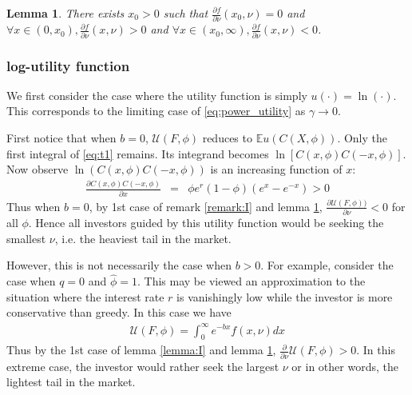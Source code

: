 \documentclass{article}
\newcommand{\pd}[2]{
  \frac{\partial #1}{\partial #2}
}
\newcommand{\opd}[1]{
  \frac{\partial}{\partial #1}
}
\newcommand{\E}{
  \mathbb{E}
}
\newcommand{\1}[1]{
  \mathbf{1}_{\{#1\}}
}
\newtheorem{lemma}{Lemma}
\begin{document}
\begin{lemma}
  \label{lemma:II}
  There exists $x_0 > 0$ such that $\pd{f}{\nu}(x_0, \nu) = 0$ and
  $\forall x \in (0, x_0), \pd{f}{\nu}(x, \nu) > 0$ and
  $\forall x \in (x_0, \infty), \pd{f}{\nu}(x, \nu) < 0$.
\end{lemma}

\subsubsection{log-utility function}
We first consider the case where the utility function is simply
$u(\cdot) = \ln(\cdot)$. This corresponds to the limiting case of
\eqref{eq:power_utility} as $\gamma \to 0$.

First notice that when $b = 0$, $\mathcal U(F, \phi)$ reduces to
$\E u(C(X, \phi))$. Only the first integral of \eqref{eq:t1} remains.
Its integrand becomes $\ln[C(x, \phi) C(-x, \phi)]$.
Now observe $\ln(C(x, \phi)C(-x, \phi))$ is an increasing function of
$x$:
\begin{eqnarray*}
  \pd{C(x, \phi) C(-x, \phi)}{x}
  &=&
  \phi e^r (1 - \phi) (e^x - e^{-x}) > 0
\end{eqnarray*}
Thus when $b = 0$, by 1st case of remark \ref{remark:I} and lemma
\ref{lemma:II},
$\pd{\mathcal U(F, \phi))}{\nu} < 0$ for all $\phi$. Hence all
investors guided by this utility function would be seeking the
smallest $\nu$, i.e. the heaviest tail in the market.

However, this is not necessarily the case when $b > 0$. For example,
consider the case when $q = 0$ and $\hat\phi = 1$. This may be
viewed an approximation to the situation where the interest rate $r$ is
vanishingly low while the investor is more conservative than
greedy. In this case we have
\begin{eqnarray*}
  \mathcal U(F, \phi) = \int_{0}^{\infty} e^{-b x} f(x, \nu) dx
\end{eqnarray*}
Thus by the 1st case of lemma \ref{lemma:I} and lemma \ref{lemma:II},
$\opd{\nu}\mathcal U(F, \phi) > 0$. In this extreme case, the investor
would rather seek the largest $\nu$ or in other words, the lightest
tail in the market.
\end{document}
